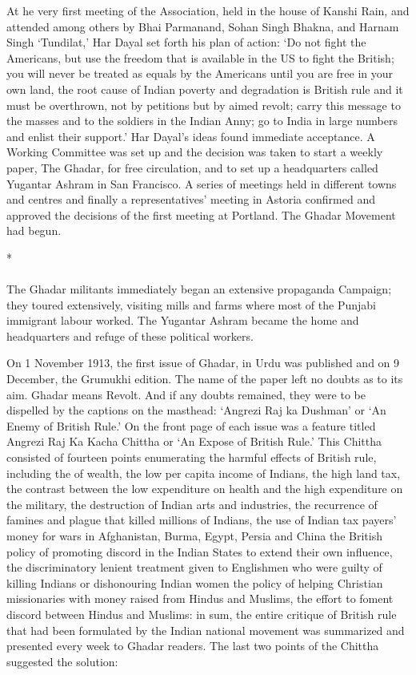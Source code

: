 At he very first meeting of the Association, held in the house of Kanshi Rain, and attended among others by Bhai Parmanand, Sohan Singh Bhakna, and Harnam Singh `Tundilat,' Har Dayal set forth his plan of action: `Do not fight the Americans, but use the freedom that is available in the US to fight the British; you will never be treated as equals by the Americans until you are free in your own land, the root cause of Indian poverty and degradation is British rule and it must be overthrown, not by petitions but by aimed revolt; carry this message to the masses and to the soldiers in the Indian Anny; go to India in large numbers and enlist their support.' Har Dayal's ideas found immediate acceptance. A Working Committee was set up and the decision was taken to start a weekly paper, The Ghadar, for free circulation, and to set up a headquarters called Yugantar Ashram in San Francisco. A series of meetings held in different towns and centres and finally a representatives' meeting in Astoria confirmed and approved the decisions of the first meeting at Portland. The Ghadar Movement had begun.

\begin{center}*\end{center}

\paragraph*{}

The Ghadar militants immediately began an extensive propaganda Campaign; they toured extensively, visiting mills and farms where most of the Punjabi immigrant labour worked. The Yugantar Ashram became the home and headquarters and refuge of these political workers.

On 1 November 1913, the first issue of Ghadar, in Urdu was published and on 9 December, the Grumukhi edition. The name of the paper left no doubts as to its aim. Ghadar means Revolt. And if any doubts remained, they were to be dispelled by the captions on the masthead: `Angrezi Raj ka Dushman' or `An Enemy of British Rule.' On the front page of each issue was a feature titled Angrezi Raj Ka Kacha Chittha or `An Expose of British Rule.' This Chittha consisted of fourteen points enumerating the harmful effects of British rule, including the of wealth, the low per capita income of Indians, the high land tax, the contrast between the low expenditure on health and the high expenditure on the military, the destruction of Indian arts and industries, the recurrence of famines and plague that killed millions of Indians, the use of Indian tax payers' money for wars in Afghanistan, Burma, Egypt, Persia and China the British policy of promoting discord in the Indian States to extend their own influence, the discriminatory lenient treatment given to Englishmen who were guilty of killing Indians or dishonouring Indian women the policy of helping Christian missionaries with money raised from Hindus and Muslims, the effort to foment discord between Hindus and Muslims: in sum, the entire critique of British rule that had been formulated by the Indian national movement was summarized and presented every week to Ghadar readers. The last two points of the Chittha suggested the solution:

